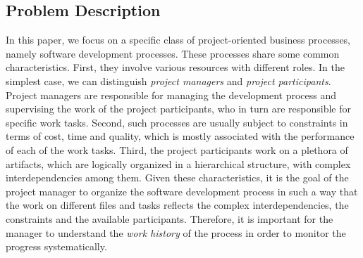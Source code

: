 \subsection{Problem Description}
\label{subsec:prob-desc}
In this paper, we focus on a specific class of project-oriented business processes, namely software development processes. These processes share some common characteristics. First, they involve various resources with different roles. In the simplest case, we can distinguish \emph{project managers} and \emph{project participants}. Project managers are responsible for managing the development process and supervising the work of the project participants, who in turn are responsible for specific work tasks. Second, such processes are usually subject to constraints in terms of cost, time and quality, which is mostly associated with the performance of each of the work tasks. Third, the project participants work on a plethora of artifacts, which are logically organized in a hierarchical structure, with complex interdependencies among them.
Given these characteristics, it is the goal of the project manager to organize the software development process in such a way that the work on different files and tasks reflects the complex interdependencies, the constraints and the available participants. Therefore, it is important for the manager to understand the \emph{work history} of the process in order to monitor the progress systematically.



